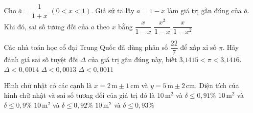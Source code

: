 \begin{ex}%
	Cho $\overline{a} = \dfrac{1}{1+x}$ $(0 < x < 1)$. Giả sử ta lấy $a = 1- x$ làm giá trị gần đúng của $\overline{a}$. Khi đó, sai số tương đối của $a$ theo $x$ bằng
	{$\dfrac{x}{1-x}$}
	{$\dfrac{x^2}{1-x}$}
	{$\dfrac{x}{1-x^2}$}
\end{ex}

\begin{ex}%
	Các nhà toán học cổ đại Trung Quốc đã dùng phân số $\dfrac{22}{7}$ để xấp xỉ số $\pi$. Hãy đánh giá sai số tuyệt đối $\Delta$ của giá trị gần đúng này, biết $3\text{,}1415<\pi<3\text{,}1416$.
	{\True$\Delta<0{,}0014$}
	{$\Delta<0{,}0013$}
	{$\Delta<0{,}0011$}
\end{ex}

\begin{ex}%
	Hình chữ nhật có các cạnh là $x = 2 \mathrm{\, m} \pm 1 \mathrm{\, cm}$ và $y = 5 \mathrm{\, m} \pm 2 \mathrm{\, cm}$. Diện tích của hình chữ nhật và sai số tương đối của giá trị đó là
	\choice
	{$10 \mathrm{\, m}^2$ và $\delta \leq 0{,}91 \%$}
	{\True $10 \mathrm{\, m}^2$ và $\delta \leq 0{,}9 \%$}
	{$10 \mathrm{\, m}^2$ và $\delta \leq 0{,}92 \%$}
	{$10 \mathrm{\, m}^2$ và $\delta \leq 0{,}93 \%$}
\end{ex}
